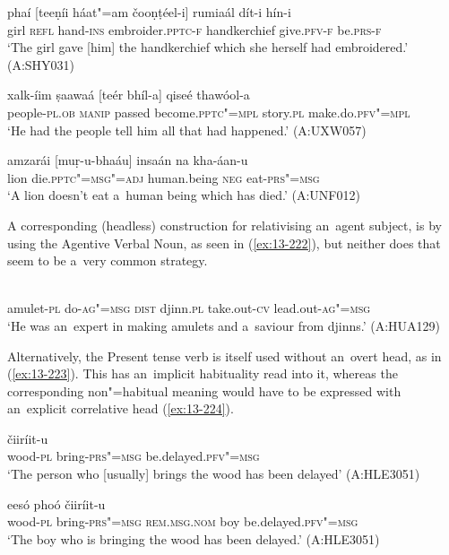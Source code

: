\begin{exe}
\ex
\label{ex:13-219}
\gll phaí [teeṇíi háat"=am čooṇṭéel-i] rumiaál dít-i  hín-i \\
girl \textsc{refl} hand-\textsc{ins} embroider.\textsc{pptc-f} handkerchief give.\textsc{pfv-f} be.\textsc{prs-f} \\
\glt `The girl gave [him] the handkerchief which she herself had embroidered.' (A:SHY031)

\ex
\label{ex:13-220}
\gll xalk-íim ṣaawaá [teér bhíl-a] qiseé  thawóol-a \\
people-\textsc{pl.ob} \textsc{manip} passed become.\textsc{pptc"=mpl} story.\textsc{pl} make.do.\textsc{pfv"=mpl} \\
\glt `He had the people tell him all that had happened.' (A:UXW057)

\ex
\label{ex:13-221}
\gll amzarái [muṛ-u-bhaáu] insaán na  kha-áan-u \\
lion die.\textsc{pptc"=msg"=adj} human.being \textsc{neg} eat-\textsc{prs"=msg} \\
\glt `A lion doesn't eat a~human being which has died.' (A:UNF012) 
\end{exe}

A corresponding (headless) construction for relativising an~agent subject, is by using the Agentive Verbal Noun, as seen in (\ref{ex:13-222}), but neither does that seem to be a~very common strategy. 

\begin{exe}
\ex
\label{ex:13-222}
 \\
amulet-\textsc{pl} do-\textsc{ag"=msg} \textsc{dist} djinn.\textsc{pl} take.out-\textsc{cv} lead.out-\textsc{ag"=msg} \\
\glt `He was an~expert in making amulets and a~saviour from djinns.' (A:HUA129) 
\end{exe}

Alternatively, the Present tense verb is itself used without an~overt head, as in (\ref{ex:13-223}). This has an~implicit habituality read into it, whereas the corresponding non"=habitual meaning would have to be expressed with an~explicit correlative head (\ref{ex:13-224}).

\begin{exe}
\ex
\label{ex:13-223}
 čiiríit-u  \\
wood-\textsc{pl} bring-\textsc{prs"=msg} be.delayed.\textsc{pfv"=msg} \\
\glt `The person who [usually] brings the wood has been delayed' (A:HLE3051)

\ex
\label{ex:13-224}
 eesó phoó čiiríit-u  \\
wood-\textsc{pl} bring-\textsc{prs"=msg} \textsc{rem.ms}\textsc{g.}\textsc{nom} boy be.delayed.\textsc{pfv"=msg}  \\
\glt `The boy who is bringing the wood has been delayed.' (A:HLE3051)
\end{exe}

